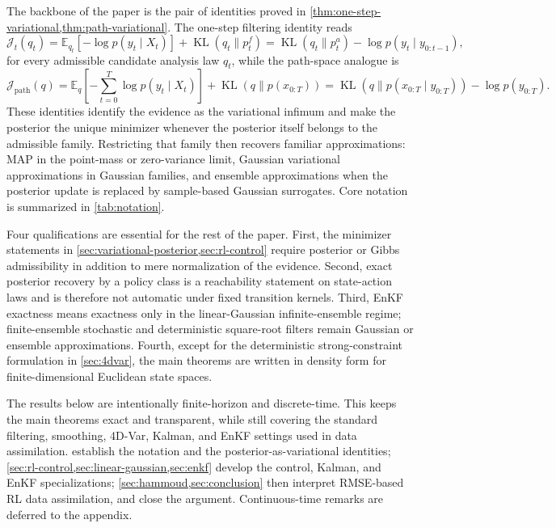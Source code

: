 \documentclass[11pt]{article}
\newcommand{\KL}{\operatorname{KL}}
\newcommand{\xtraj}{x_{0:T}}
\newcommand{\ytraj}{y_{0:T}}
\numberwithin{equation}{section}
\theoremstyle{plain}
\theoremstyle{definition}
\theoremstyle{remark}
\begin{document}
The backbone of the paper is the pair of identities proved in \cref{thm:one-step-variational,thm:path-variational}. The one-step filtering identity reads
\[
\mathcal J_t(q_t)
=
\mathbb E_{q_t}\!\left[-\log p(y_t\mid X_t)\right]
+
\KL(q_t\|p_t^f)
=
\KL(q_t\|p_t^a)-\log p(y_t\mid y_{0:t-1}),
\]
for every admissible candidate analysis law $q_t$, while the path-space analogue is
\[
\mathcal J_{\mathrm{path}}(q)
=
\mathbb E_q\!\left[-\sum_{t=0}^{T}\log p(y_t\mid X_t)\right]
+
\KL(q\|p(\xtraj))
=
\KL(q\|p(\xtraj\mid \ytraj))-\log p(\ytraj).
\]
These identities identify the evidence as the variational infimum and make the posterior the unique minimizer whenever the posterior itself belongs to the admissible family. Restricting that family then recovers familiar approximations: MAP in the point-mass or zero-variance limit, Gaussian variational approximations in Gaussian families, and ensemble approximations when the posterior update is replaced by sample-based Gaussian surrogates. Core notation is summarized in \cref{tab:notation}.

Four qualifications are essential for the rest of the paper. First, the minimizer statements in \cref{sec:variational-posterior,sec:rl-control} require posterior or Gibbs admissibility in addition to mere normalization of the evidence. Second, exact posterior recovery by a policy class is a reachability statement on state-action laws and is therefore not automatic under fixed transition kernels. Third, EnKF exactness means exactness only in the linear-Gaussian infinite-ensemble regime; finite-ensemble stochastic and deterministic square-root filters remain Gaussian or ensemble approximations. Fourth, except for the deterministic strong-constraint formulation in \cref{sec:4dvar}, the main theorems are written in density form for finite-dimensional Euclidean state spaces.

The results below are intentionally finite-horizon and discrete-time. This keeps the main theorems exact and transparent, while still covering the standard filtering, smoothing, 4D-Var, Kalman, and EnKF settings used in data assimilation.  establish the notation and the posterior-as-variational identities; \cref{sec:rl-control,sec:linear-gaussian,sec:enkf} develop the control, Kalman, and EnKF specializations; 
\cref{sec:hammoud,sec:conclusion} then interpret RMSE-based RL data assimilation, and close the argument. Continuous-time remarks are deferred to the appendix.
\end{document}
